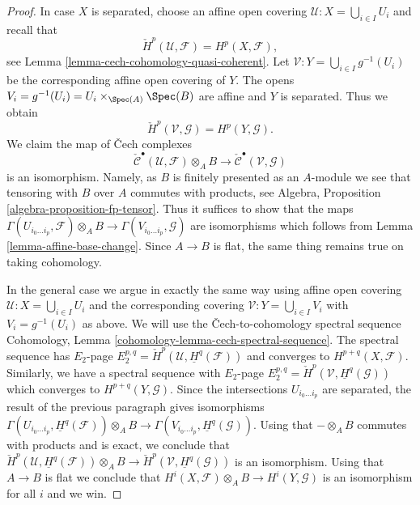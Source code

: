 \begin{proof}
In case $X$ is separated, choose an affine open covering
$\mathcal{U} : X = \bigcup_{i \in I} U_i$ and recall that
$$
\check{H}^p(\mathcal{U}, \mathcal{F}) = H^p(X, \mathcal{F}),
$$
see
Lemma \ref{lemma-cech-cohomology-quasi-coherent}.
Let $\mathcal{V} : Y = \bigcup_{i \in I} g^{-1}(U_i)$
be the corresponding affine open covering of $Y$.
The opens $V_i = g^{-1}(U_i) = U_i \times_{\Spec(A)} \Spec(B)$
are affine and $Y$ is separated. Thus we obtain
$$
\check{H}^p(\mathcal{V}, \mathcal{G}) = H^p(Y, \mathcal{G}).
$$
We claim the map of {\v C}ech complexes
$$
\check{\mathcal{C}}^\bullet(\mathcal{U}, \mathcal{F}) \otimes_A B
\longrightarrow
\check{\mathcal{C}}^\bullet(\mathcal{V}, \mathcal{G})
$$
is an isomorphism. Namely, as $B$ is finitely presented as an $A$-module
we see that tensoring with $B$ over $A$ commutes with products, see
Algebra, Proposition \ref{algebra-proposition-fp-tensor}.
Thus it suffices to show that the maps
$\Gamma(U_{i_0 \ldots i_p}, \mathcal{F}) \otimes_A B \to
\Gamma(V_{i_0 \ldots i_p}, \mathcal{G})$ 
are isomorphisms which follows from
Lemma \ref{lemma-affine-base-change}.
Since $A \to B$ is flat, the same thing remains true on taking cohomology.

\medskip\noindent
In the general case we argue in exactly the same way using affine
open covering $\mathcal{U} : X = \bigcup_{i \in I} U_i$ and the
corresponding covering $\mathcal{V} : Y = \bigcup_{i \in I} V_i$
with $V_i = g^{-1}(U_i)$ as above. We will use the
{\v C}ech-to-cohomology spectral sequence
Cohomology, Lemma \ref{cohomology-lemma-cech-spectral-sequence}.
The spectral sequence has $E_2$-page
$E_2^{p, q} = \check{H}^p(\mathcal{U}, \underline{H}^q(\mathcal{F}))$
and converges to $H^{p + q}(X, \mathcal{F})$.
Similarly, we have a spectral sequence with $E_2$-page
$E_2^{p, q} = \check{H}^p(\mathcal{V}, \underline{H}^q(\mathcal{G}))$
which converges to $H^{p + q}(Y, \mathcal{G})$.
Since the intersections $U_{i_0 \ldots i_p}$ are separated, the result
of the previous paragraph gives isomorphisms
$\Gamma(U_{i_0 \ldots i_p}, \underline{H}^q(\mathcal{F})) \otimes_A B
\to \Gamma(V_{i_0 \ldots i_p}, \underline{H}^q(\mathcal{G}))$.
Using that $- \otimes_A B$ commutes with products and is exact, we conclude
that
$\check{H}^p(\mathcal{U}, \underline{H}^q(\mathcal{F})) \otimes_A B
\to \check{H}^p(\mathcal{V}, \underline{H}^q(\mathcal{G}))$
is an isomorphism. Using that $A \to B$ is flat we conclude that
$H^i(X, \mathcal{F}) \otimes_A B \to H^i(Y, \mathcal{G})$
is an isomorphism for all $i$ and we win.
\end{proof}









